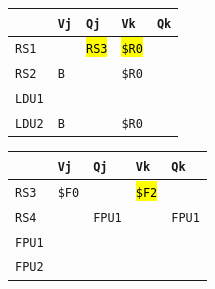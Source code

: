 \begin{enumerate}
    \begin{minipage}{0.45\textwidth}
        \centering
        \begin{tabular}{@{} l | l l l l @{}}
            \toprule
                & \texttt{Vj} & \texttt{Qj} & \texttt{Vk} & \texttt{Qk} \\
            \midrule
            \texttt{RS1} & & \hl{\texttt{RS3}} & \hl{\texttt{\$R0}} & \\ [.3em]
            \texttt{RS2} & \texttt{B} & & \texttt{\$R0} & \\
            \cmidrule{1-5}
            \texttt{LDU1} & & & & \\ [.3em]
            \texttt{LDU2} & \texttt{B} & & \texttt{\$R0} & \\
            \bottomrule
        \end{tabular}
    \end{minipage}
    \hfill
    \begin{minipage}{0.45\textwidth}
        \centering
        \begin{tabular}{@{} l | l l l l @{}}
            \toprule
            & \texttt{Vj} & \texttt{Qj} & \texttt{Vk} & \texttt{Qk} \\
            \midrule
            \texttt{RS3} & \texttt{\$F0} & & \hl{\texttt{\$F2}} & \\ [.3em]
            \texttt{RS4} & & \texttt{FPU1} & & \texttt{FPU1} \\
            \cmidrule{1-5}
            \texttt{FPU1} & & & & \\ [.3em]
            \texttt{FPU2} & & & & \\
            \bottomrule
        \end{tabular}
    \end{minipage}


\end{enumerate}
